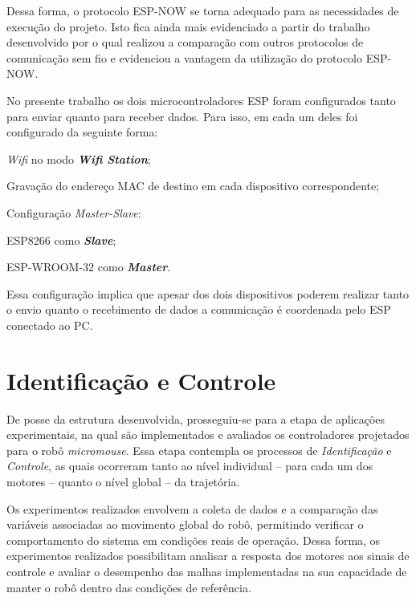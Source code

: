                 Dessa forma, o protocolo ESP-NOW se torna adequado para as necessidades de execução do projeto. Isto fica ainda mais evidenciado a partir do trabalho desenvolvido por  o qual realizou a comparação com outros protocolos de comunicação sem fio e evidenciou a vantagem da utilização do protocolo ESP-NOW.

                No presente trabalho os dois microcontroladores ESP foram configurados tanto para enviar quanto para receber dados. Para isso, em cada um deles foi configurado da seguinte forma: 
                
                \begin{alineas}
                    \item \textit{Wifi} no modo \textbf{\textit{Wifi Station}};
                    \item Gravação do endereço MAC de destino em cada dispositivo correspondente;
                    \item Configuração \textit{Master-Slave}:
                    \begin{subalineas}
                        \item ESP8266 como \textbf{\textit{Slave}};
                        \item ESP-WROOM-32 como \textbf{\textit{Master}}.
                    \end{subalineas}
                \end{alineas}

                Essa configuração implica que apesar dos dois dispositivos poderem realizar tanto o envio quanto o recebimento de dados a comunicação é coordenada pelo ESP conectado ao \gls{PC}.  

    \section{Identificação e Controle} \label{sec:id-controle-classico-metodologia}

        De posse da estrutura desenvolvida, prosseguiu-se para a etapa de aplicações experimentais, na qual são implementados e avaliados os controladores projetados para o robô \textit{micromouse}. Essa etapa contempla os processos de \textit{Identificação} e \textit{Controle}, as quais ocorreram tanto ao nível individual -- para cada um dos motores -- quanto o nível global -- da trajetória. 
        
        Os experimentos realizados envolvem a coleta de dados e a comparação das variáveis associadas ao movimento global do robô, permitindo verificar o comportamento do sistema em condições reais de operação. Dessa forma, os experimentos realizados possibilitam analisar a resposta dos motores aos sinais de controle e avaliar o desempenho das malhas implementadas na sua capacidade de manter o robô dentro das condições de referência.

